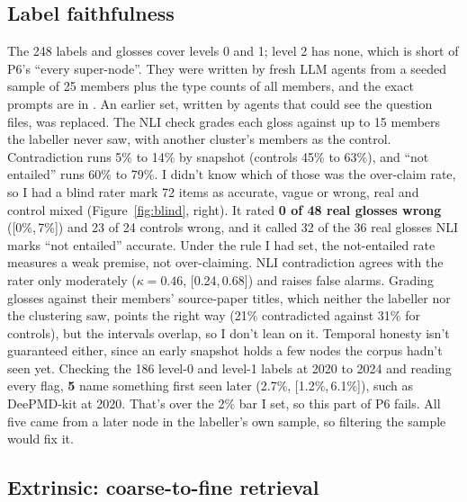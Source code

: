 \documentclass[10pt,a4paper]{article}
\newcommand{\code}[1]{\texttt{\small\detokenize{#1}}}
\newcommand{\ci}[2]{[#1,\,#2]}
\begin{document}
\subsection{Label faithfulness}
\label{sec:faith}

The 248 labels and glosses cover levels 0 and 1; level 2 has none, which is short of P6's ``every
super-node''. They were written by fresh LLM agents from a seeded sample of 25 members plus the type counts
of all members, and the exact prompts are in \code{labeling_input.json}. An earlier set, written by agents
that could see the question files, was replaced. The NLI check grades each gloss against up to 15
members the labeller never saw, with another cluster's members as the control. Contradiction runs 5\% to
14\% by snapshot (controls 45\% to 63\%), and ``not entailed'' runs 60\% to 79\%. I didn't know which of
those was the over-claim rate, so I had a blind rater mark 72 items as accurate, vague or wrong, real and
control mixed (Figure~\ref{fig:blind}, right). It rated \textbf{0 of 48 real glosses wrong}
(\ci{0\%}{7\%}) and 23 of 24 controls wrong, and it called 32 of the 36 real glosses NLI marks ``not
entailed'' accurate. Under the rule I had set, the not-entailed rate measures a weak premise, not
over-claiming. NLI contradiction agrees with the rater only moderately ($\kappa = 0.46$,
\ci{0.24}{0.68}) and raises false alarms. Grading glosses against their members' source-paper titles,
which neither the labeller nor the clustering saw, points the right way (21\% contradicted against 31\% for
controls), but the intervals overlap, so I don't lean on it. Temporal honesty isn't guaranteed either,
since an early snapshot holds a few nodes the corpus hadn't seen yet. Checking the 186 level-0 and level-1
labels at 2020 to 2024 and reading every flag, \textbf{5} name something first seen later (2.7\%,
\ci{1.2\%}{6.1\%}), such as DeePMD-kit at 2020. That's over the 2\% bar I set, so this part of P6 fails.
All five came from a later node in the labeller's own sample, so filtering the sample would fix it.

\subsection{Extrinsic: coarse-to-fine retrieval}
\end{document}
